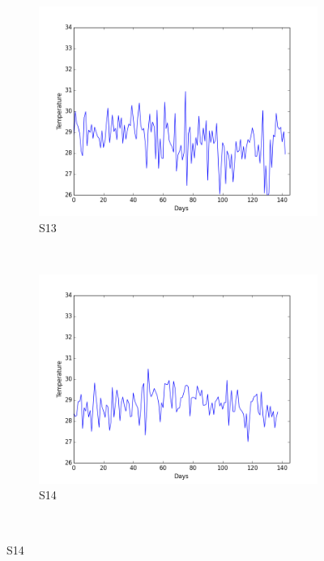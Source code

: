 \documentclass[12pt]{article} %
\begin{document}
\begin{figure}[H]
    \begin{subfigure}[b]{0.30\textwidth}
        \includegraphics[width=\textwidth]{img/graphs/13-airtemp-1}
        \caption{S13}
        \label{fig:s13AT}
    \end{subfigure}
    ~ %
    \begin{subfigure}[b]{0.30\textwidth}
        \includegraphics[width=\textwidth]{img/graphs/14-airtemp-1}
        \caption{S14}
        \label{fig:s14AT}
    \end{subfigure}
    ~ %

\end{figure}
\end{document}
